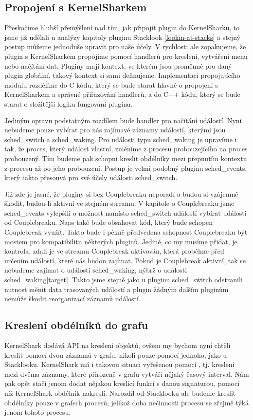 \subsection{Propojení s KernelSharkem}
Přeskočíme hlubší přemýšlení nad tím, jak připojit plugin do KernelSharku, to jsme již udělali u analýzy kapitoly pluginu Stacklook \ref{lookin-at-stacks} a stejný postup můžeme jednoduše upravit pro naše účely. V rychlosti ale zopakujeme, že plugin s KernelSharkem propojíme pomocí handlerů pro kreslení, vytváření menu nebo načítání dat. Pluginy mají kontext, ve kterém jsou proměnné pro daný plugin globální, takový kontext si sami definujeme. Implementaci propojujícího modulu rozdělíme do C kódu, který se bude starat hlavně o propojení s KernelSharkem a správné přiřazování handlerů, a do C++ kódu, který se bude starat o složitější logiku fungování pluginu.

Jediným opravu podstatným rozdílem bude handler pro načítání událostí. Nyní nebudeme pouze vybírat pro nás zajímavé záznamy událostí, kterými jsou sched\_switch a sched\_waking. Pro události typu sched\_waking je upravíme i tak, že proces, který událost vlastní, změníme z procesu probouzejícího na proces probouzený. Tím budeme pak schopni kreslit obdélníky mezi přepnutím kontextu z procesu až po jeho probouzení. Postup je velmi podobný pluginu sched\_events, který takto přesouvá pro své účely události sched\_switch.

Již zde je jasné, že pluginy si bez Couplebreaku neporadí a budou si vzájemně škodit, budou-li aktivní ve stejném streamu. V kapitole o Couplebreaku jsme sched\_events vylepšili o možnost namísto sched\_switch událostí vybírat události od Couplebreaku. Naps také bude obsahovat kód, který bude schopen Couplebreak využít. Takto bude i pěkně předvedena schopnost Couplebreaku být mostem pro kompatibilitu některých pluginů. Jediné, co my musíme přidat, je kontrola, zdali je ve streamu Couplebreak aktivován, která proběhne před určením událostí, které nás budou zajímat. Pokud je Couplebreak aktivní, tak se nebudeme zajímat o události sched\_waking, nýbrž o události sched\_waking[target]. Takto jsme stejně jako u pluginu sched\_switch odstranili nutnost měnit data trasovaných událostí a plugin žádným dalším pluginům nemůže škodit reorganizací záznamů událostí.

\subsection{Kreslení obdélníků do grafu}
KernelShark dodává API na kreslení objektů, ovšem my bychom nyní chtěli kreslit pomocí dvou záznamů v grafu, nikoli pouze pomocí jednoho, jako u Stacklooku. KernelShark má i takovou situaci vyřešenou pomocí , tj. kreslení mezi dvěma záznamy, které přirozeně v grafu vytváří nějaký časový interval. Nám pak opět stačí jenom dodat nějakou kreslící funkci s danou signaturou, pomocí níž KernelShark obdélník nakreslí. Narozdíl od Stacklooku ale budeme kreslit obdélníky pouze v grafech procesů, jelikož doba nečinnosti procesu se zřejmě týká jenom tohoto procesu.

